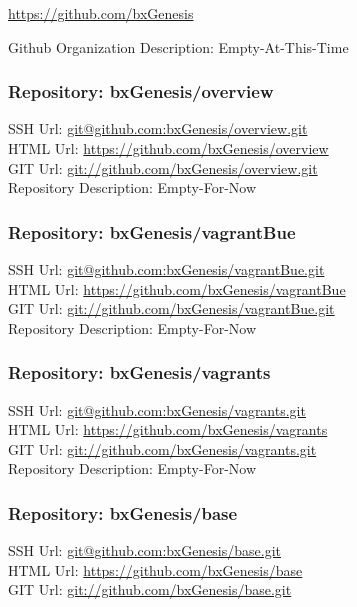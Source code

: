\url{https://github.com/bxGenesis}

Github Organization Description: Empty-At-This-Time

\subsubsection{Repository: bxGenesis/overview}

SSH Url:  \url{git@github.com:bxGenesis/overview.git}\\
HTML Url: \url{https://github.com/bxGenesis/overview}\\
GIT Url:  \url{git://github.com/bxGenesis/overview.git}\\


Repository Description: Empty-For-Now

\subsubsection{Repository: bxGenesis/vagrantBue}

SSH Url:  \url{git@github.com:bxGenesis/vagrantBue.git}\\
HTML Url: \url{https://github.com/bxGenesis/vagrantBue}\\
GIT Url:  \url{git://github.com/bxGenesis/vagrantBue.git}\\


Repository Description: Empty-For-Now

\subsubsection{Repository: bxGenesis/vagrants}

SSH Url:  \url{git@github.com:bxGenesis/vagrants.git}\\
HTML Url: \url{https://github.com/bxGenesis/vagrants}\\
GIT Url:  \url{git://github.com/bxGenesis/vagrants.git}\\


Repository Description: Empty-For-Now

\subsubsection{Repository: bxGenesis/base}

SSH Url:  \url{git@github.com:bxGenesis/base.git}\\
HTML Url: \url{https://github.com/bxGenesis/base}\\
GIT Url:  \url{git://github.com/bxGenesis/base.git}\\


